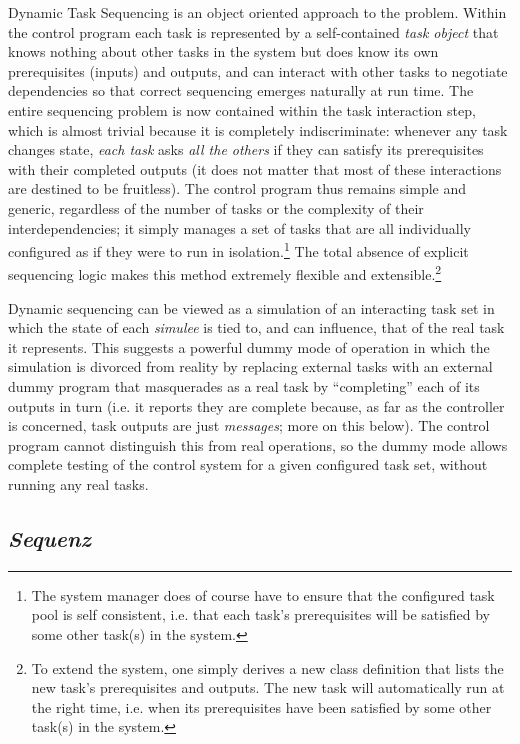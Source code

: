 \documentclass[11pt,a4paper]{article}
\begin{document}
Dynamic Task Sequencing is an object oriented approach to the problem.
Within the control program each task is represented by a self-contained
{\em task object} that knows nothing about other tasks in the system but
does know its own prerequisites (inputs) and outputs, and can interact
with other tasks to negotiate dependencies so that correct sequencing
emerges naturally at run time.  The entire sequencing problem is now
contained within the task interaction step, which is almost trivial
because it is completely indiscriminate: whenever any task changes
state, {\em each task} asks {\em all the others} if they can satisfy its
prerequisites with their completed outputs (it does not matter that most
of these interactions are destined to be fruitless). The control program
thus remains simple and generic, regardless of the number of tasks or
the complexity of their interdependencies; it simply manages a set of
tasks that are all individually configured as if they were to run in
isolation.\footnote{The system manager does of course have to ensure
that the configured task pool is self consistent, i.e. that each task's
prerequisites will be satisfied by some other task(s) in the system.}
The total absence of explicit sequencing logic makes this method
extremely flexible and extensible.\footnote{To extend the system, one
simply derives a new class definition that lists the new task's
prerequisites and outputs. The new task will automatically run at the
right time, i.e. when its prerequisites have been satisfied by some
other task(s) in the system.}

Dynamic sequencing can be viewed as a simulation of an interacting task
set in which the state of each {\em simulee} is tied to, and can
influence, that of the real task it represents.  This suggests a
powerful dummy mode of operation in which the simulation is divorced
from reality by replacing external tasks with an external dummy program
that masquerades as a real task by ``completing'' each of its outputs in
turn (i.e. it reports they are complete because, as far as the
controller is concerned, task outputs are just {\em messages}; more on
this below).  The control program cannot distinguish this from real
operations, so the dummy mode allows complete testing of the control
system for a given configured task set, without running any real tasks.


\subsection{{\em Sequenz}}
\end{document}
